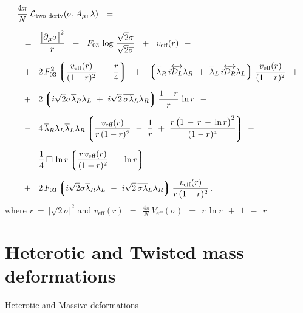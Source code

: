\documentclass{beamer}
\begin{document}
\begin{frame}{}
	\vskip -6mm
{\footnotesize
\begin{align*}
%
	& \frac{4\pi}{N}\, \cell_\text{two deriv}(\sigma, A_\mu, \lambda)    ~~=~~  
	\\[2mm]
%
	& ~~=~~
	\frac{ \big|\p_\mu \sigma\big|^2 } r
	~~-~~
	F_{03}\, \log\, \frac{\sqrt{2}\sigma}{\sqrt{2}\ov\sigma}
	~~+~~
	v_\text{eff}(r)
	~~-
	\\[2mm]
%
	&
	~~+~~
	2\, F_{03}^2
	\lgr \frac{v_\text{eff}(r)}{(1 - r)^2}  ~-~  \frac{r}{4} \rgr
	~~+~~
	\lgr 
		\ov\lambda{}_R\, i\overleftrightarrow{\md_L} \lambda_R  ~+~ 
		\ov\lambda{}_L\, i\overleftrightarrow{\md_R} \lambda_L
	\rgr
	\frac{v_\text{eff}(r)}{(1 - r)^2}
	~~+
	\\[2mm]
%
	&
	~~+~~ 
	2 \lgr
		i\sqrt{2}\sigma\ov\lambda{}_R\lambda_L  ~+~  
		i\sqrt{2}\,\ov{\sigma\lambda}{}_L\lambda_R
	\rgr
	\frac{1 - r}{r}\, \ln r
	~~-
	\\[2mm]
%
	&
	~~-~~
	4\, \ov\lambda{}_R \lambda_L \ov\lambda{}_L \lambda_R
	\lgr
		\frac{v_\text{eff}(r)}{r\, (1 - r)^2}
		~-~  \frac{1}{r}
		~+~  \frac{r\, \big( 1 \,-\, r \,-\, \ln r \big)^2}{ (1 - r)^4 }
	\rgr
	~-
	\\[2mm]
%
	&
	~~-~~
	\frac{1}{4}\,\Box\,\ln r
	\lgr
		\frac{r\, v_\text{eff}(r)}{(1 - r)^2}  ~-~  \ln r
	\rgr
	~~+
	\\[2mm]
%
	&
	~~+~~
	2\, F_{03} \lgr 
			i\sqrt{2}\sigma\ov\lambda{}_R\lambda_L ~-~
			i\sqrt{2}\,\ov{\sigma\lambda}{}_L\lambda_R
		   \rgr
	\frac{v_\text{eff}(r)}{r\, (1 - r)^2}\,.
\end{align*}
	where $ r ~=~ \big|\sqrt{2}\sigma\big|^2 $ and
$
	v_\text{eff}(r)    ~~=~~    
	\frac{\displaystyle 4\pi}{\displaystyle N}\, V_\text{eff}(\sigma)    ~~=~~    
	r\, \ln r  ~~+~~  1  ~~-~~  r
$
}
\end{frame}




\section{Heterotic and Twisted mass deformations}
\begin{frame}{}
\fontsize{60pt}{60pt}\selectfont
\begin{center}
        Heterotic and Massive deformations
\end{center}
\end{frame}
\end{document}
